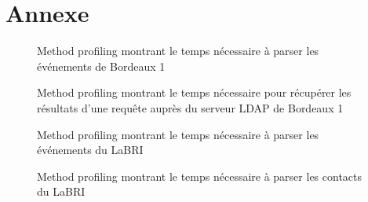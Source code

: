 \chapter{Annexe}

\begin{figure}[h!]
  \label{fig:method_prof1}
  \center
  \setlength\fboxsep{5pt}
  \setlength\fboxrule{0.5pt}
  \caption{Method profiling montrant le temps nécessaire à parser les événements de Bordeaux 1}
\end{figure}

\begin{figure}[h!]
  \label{fig:method_prof2}
  \center
  \setlength\fboxsep{5pt}
  \setlength\fboxrule{0.5pt}
  \caption{Method profiling montrant le temps nécessaire pour récupérer les résultats d'une requête auprès du serveur LDAP de Bordeaux 1}
\end{figure}

\begin{figure}[h!]
  \label{fig:method_prof3}
  \center
  \setlength\fboxsep{5pt}
  \setlength\fboxrule{0.5pt}
  \caption{Method profiling montrant le temps nécessaire à parser les événements du LaBRI}
\end{figure}

\begin{figure}[h!]
  \label{fig:method_prof4}
  \center
  \setlength\fboxsep{5pt}
  \setlength\fboxrule{0.5pt}
  \caption{Method profiling montrant le temps nécessaire à parser les contacts du LaBRI}
\end{figure}